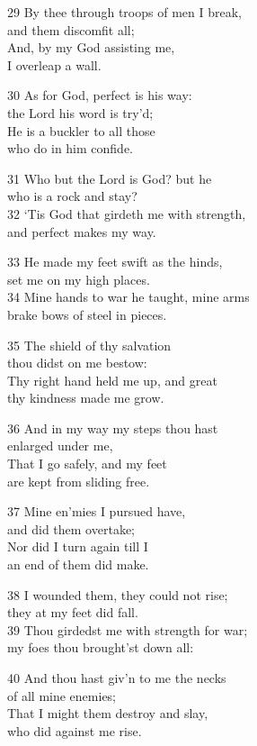 \begin{multicols}{3}
29 By thee through troops of men I break,\\
and them discomfit all;\\
And, by my God assisting me,\\
I overleap a wall.

30 As for God, perfect is his way:\\
the Lord his word is try’d;\\
He is a buckler to all those\\
who do in him confide.

31 Who but the Lord is God? but he\\
who is a rock and stay?\\
32 ‘Tis God that girdeth me with strength,\\
and perfect makes my way.

33 He made my feet swift as the hinds,\\
set me on my high places.\\
34 Mine hands to war he taught, mine arms\\
brake bows of steel in pieces.

35 The shield of thy salvation\\
thou didst on me bestow:\\
Thy right hand held me up, and great\\
thy kindness made me grow.

36 And in my way my steps thou hast\\
enlarged under me,\\
That I go safely, and my feet\\
are kept from sliding free.

37 Mine en’mies I pursued have,\\
and did them overtake;\\
Nor did I turn again till I\\
an end of them did make.

38 I wounded them, they could not rise;\\
they at my feet did fall.\\
39 Thou girdedst me with strength for war;\\
my foes thou brought’st down all:

40 And thou hast giv’n to me the necks\\
of all mine enemies;\\
That I might them destroy and slay,\\
who did against me rise.


\end{multicols}

